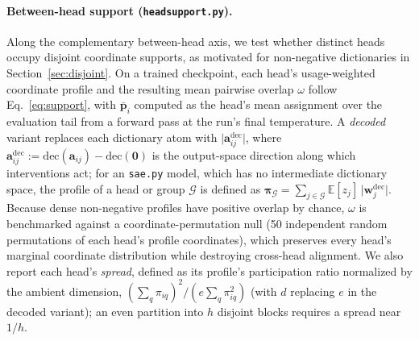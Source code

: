 \paragraph{Between-head support (\texttt{headsupport.py}).}
Along the complementary between-head axis, we test whether distinct heads
occupy disjoint coordinate supports, as motivated for non-negative
dictionaries in Section~\ref{sec:disjoint}. On a trained checkpoint, each
head's usage-weighted coordinate profile and the resulting mean pairwise
overlap $\omega$ follow Eq.~\eqref{eq:support}, with $\bar{\mathbf{p}}_i$
computed as the head's mean assignment over the evaluation tail from a
forward pass at the run's final temperature. A \emph{decoded} variant
replaces each dictionary atom with $\lvert\mathbf{a}^{\mathrm{dec}}_{ij}\rvert$,
where $\mathbf{a}^{\mathrm{dec}}_{ij} := \mathrm{dec}(\mathbf{a}_{ij}) -
\mathrm{dec}(\mathbf{0})$ is the output-space direction along which
interventions act; for an \texttt{sae.py} model, which has no intermediate
dictionary space, the profile of a head or group $\mathcal{G}$ is defined
as $\boldsymbol{\pi}_{\mathcal{G}} = \sum_{j \in \mathcal{G}}
\mathbb{E}[z_j]\,\lvert \mathbf{w}^{\mathrm{dec}}_j\rvert$. Because
dense non-negative profiles have positive overlap by chance, $\omega$ is
benchmarked against a coordinate-permutation null (50 independent random
permutations of each head's profile coordinates), which preserves every
head's marginal coordinate distribution while destroying cross-head
alignment. We also report each head's \emph{spread}, defined as its
profile's participation ratio normalized by the ambient dimension,
$(\sum_q \pi_{iq})^2 / (e \sum_q \pi_{iq}^2)$ (with $d$ replacing $e$ in
the decoded variant); an even partition into $h$ disjoint blocks requires a
spread near $1/h$.

